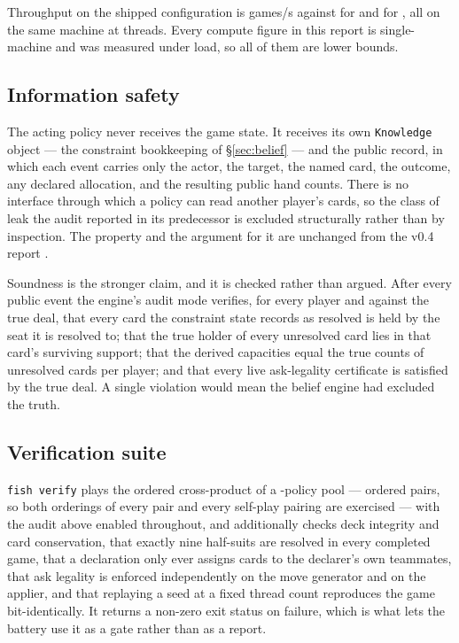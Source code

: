 Throughput on the shipped configuration is \vsixThroughputSix{} games/s against
\vsixThroughputFive{} for \vfive{} and \vsixThroughputFour{} for \vfour{}, all on
the same machine at \vsixCores{} threads. Every compute figure in this report is
single-machine and was measured under load, so all of them are lower bounds.

\subsection{Information safety}
\label{sec:engine-safety}

The acting policy never receives the game state. It receives its own
\texttt{Knowledge} object --- the constraint bookkeeping of \S\ref{sec:belief}
--- and the public record, in which each event carries only the actor, the
target, the named card, the outcome, any declared allocation, and the resulting
public hand counts. There is no interface through which a policy can read
another player's cards, so the class of leak the \vthree{} audit reported in its
predecessor \cite{fishbot03} is excluded structurally rather than by inspection.
The property and the argument for it are unchanged from the v0.4 report
\cite{fishbot04}.

Soundness is the stronger claim, and it is checked rather than argued. After
every public event the engine's audit mode verifies, for every player and against
the true deal, that every card the constraint state records as resolved is held
by the seat it is resolved to; that the true holder of every unresolved card lies
in that card's surviving support; that the derived capacities equal the true
counts of unresolved cards per player; and that every live ask-legality
certificate is satisfied by the true deal. A single violation would mean the
belief engine had excluded the truth.

\subsection{Verification suite}
\label{sec:engine-verify}

\texttt{fish verify} plays the ordered cross-product of a \numVerifyPool{}-policy
pool --- \numVerifyPairs{} ordered pairs, so both orderings of every pair and
every self-play pairing are exercised --- with the audit above enabled
throughout, and additionally checks deck integrity and card conservation, that
exactly nine half-suits are resolved in every completed game, that a declaration
only ever assigns cards to the declarer's own teammates, that ask legality is
enforced independently on the move generator and on the applier, and that
replaying a seed at a fixed thread count reproduces the game bit-identically. It
returns a non-zero exit status on failure, which is what lets the battery use it
as a gate rather than as a report.

